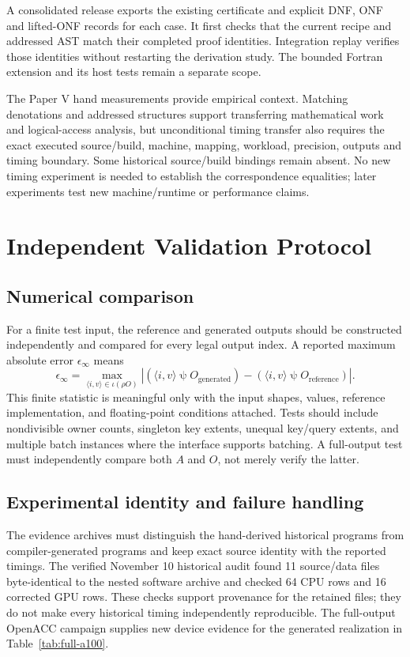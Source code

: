 \documentclass[sigplan,10pt,review,anonymous,balance=false,pbalance=false]{acmart}
\newcommand{\ps}{\mathbin{\psi}}
\begin{document}
A consolidated release exports the existing certificate and explicit DNF, ONF and lifted-ONF records for each case. It first checks that the current recipe and addressed AST match their completed proof identities. Integration replay verifies those identities without restarting the derivation study. The bounded Fortran extension and its host tests remain a separate scope.

The Paper V hand measurements provide empirical context. Matching denotations and addressed structures support transferring mathematical work and logical-access analysis, but unconditional timing transfer also requires the exact executed source/build, machine, mapping, workload, precision, outputs and timing boundary. Some historical source/build bindings remain absent. No new timing experiment is needed to establish the correspondence equalities; later experiments test new machine/runtime or performance claims.

\section{Independent Validation Protocol}
\subsection{Numerical comparison}
For a finite test input, the reference and generated outputs should be constructed independently and compared for every legal output index. A reported maximum absolute error $\epsilon_\infty$ means
\begin{equation}
 \epsilon_\infty=\max_{\langle i,v\rangle\in\iota(\rho O)}
 \left| (\langle i,v\rangle\ps O_{\mathrm{generated}})-
 (\langle i,v\rangle\ps O_{\mathrm{reference}})\right|.
\end{equation}
This finite statistic is meaningful only with the input shapes, values, reference implementation, and floating-point conditions attached. Tests should include nondivisible owner counts, singleton key extents, unequal key/query extents, and multiple batch instances where the interface supports batching. A full-output test must independently compare both $A$ and $O$, not merely verify the latter.

\subsection{Experimental identity and failure handling}
The evidence archives must distinguish the hand-derived historical programs from compiler-generated programs and keep exact source identity with the reported timings. The verified November 10 historical audit found 11 source/data files byte-identical to the nested software archive and checked 64 CPU rows and 16 corrected GPU rows. These checks support provenance for the retained files; they do not make every historical timing independently reproducible. The full-output OpenACC campaign supplies new device evidence for the generated realization in Table~\ref{tab:full-a100}.
\end{document}
